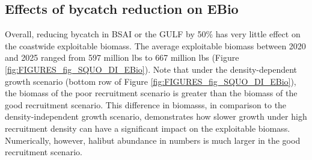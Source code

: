 \subsection{Effects of bycatch reduction on EBio} %
Overall, reducing bycatch in BSAI or the GULF by 50\% has very little effect on the coastwide exploitable biomass.  The average exploitable biomass between 2020 and 2025 ranged from 597 million lbs to 667 million lbs (Figure \ref{fig:FIGURES_fig_SQUO_DI_EBio}).  Note that under the density-dependent growth scenario (bottom row of Figure \ref{fig:FIGURES_fig_SQUO_DI_EBio}), the biomass of the poor recruitment scenario is greater than the biomass of the good recruitment scenario.   This difference in biomasss, in comparison to the density-independent growth scenario, demonstrates how slower growth under high recruitment density can have a significant impact on the exploitable biomass. Numerically, however, halibut abundance in numbers is much larger in the good recruitment scenario.

